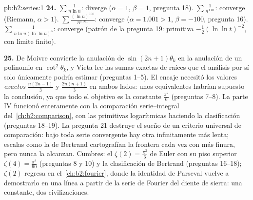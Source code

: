 \begin{solution}{pb:b2:series:1}
\textbf{24.} $\sum\frac1{n\ln n}$: diverge ($\alpha = 1$, $\beta =
1$, pregunta 18). $\sum\frac1{n^{1.01}}$: converge (Riemann,
$\alpha > 1$). $\sum\frac{(\ln n)^{100}}{n^{1.001}}$: converge
($\alpha = 1.001 > 1$, $\beta = -100$, pregunta 16).
$\sum\frac1{n\ln n(\ln\ln n)^3}$: converge (patrón de la pregunta
19: primitiva $-\frac12(\ln\ln t)^{-2}$, con límite finito).

\textbf{25.} De Moivre convierte la anulación de
$\sin(2n{+}1)\theta_k$ en la anulación de un polinomio en
$\cot^2\theta_k$, y Vieta lee las sumas exactas de raíces que el
análisis por sí solo únicamente podría estimar (preguntas 1--5).
El encaje necesitó los valores \emph{exactos} $\frac{n(2n-1)}3$ y
$\frac{2n(n+1)}3$ en ambos lados: unos equivalentes habrían
supuesto la conclusión, ya que todo el objetivo es la constante
$\frac{\pi^2}6$ (preguntas 7--8). La parte IV funcionó
enteramente con la comparación serie--integral del~\cref{ch:b2:comparison}, con las primitivas logarítmicas haciendo
la clasificación (preguntas 18--19). La pregunta 21 destruye el
sueño de un criterio universal de comparación: bajo toda serie
convergente hay otra infinitamente más lenta; escalas como la de
Bertrand cartografían la frontera cada vez con más finura, pero
nunca la alcanzan. Cumbres: el $\zeta(2) = \frac{\pi^2}6$ de
Euler con su piso superior $\zeta(4) = \frac{\pi^4}{90}$
(preguntas 8 y 10) y la clasificación de Bertrand (preguntas
16--18); $\zeta(2)$ regresa en el~\cref{ch:b2:fourier}, donde la
identidad de Parseval vuelve a demostrarlo en una línea a partir
de la serie de Fourier del diente de sierra: una constante, dos
civilizaciones.
\end{solution}
